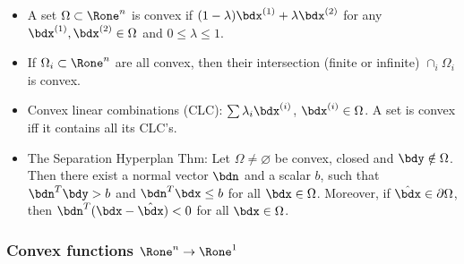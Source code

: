 \documentclass[a4paper]{article}
\begin{document}
\begin{itemize}
  \item A set $\Omega\subset\Rone^n$ is convex if
    $(1-\lambda)\bdx^{(1)}+\lambda\bdx^{(2)}$
    for any
    $\bdx^{(1)},\bdx^{(2)}\in\Omega$ and
    $0\le\lambda\le1$.

  \item If $\Omega_i\subset\Rone^n$ are all convex, then their
    intersection (finite or infinite) $\cap_i \Omega_i$ is convex.

  \item Convex linear combinations (CLC):
    $\sum\lambda_i\bdx^{(i)}$, $\bdx^{(i)}\in\Omega$.
    A set is convex iff it contains all
    its CLC's.

  \item The Separation Hyperplan Thm: Let $\Omega\neq\varnothing$ be convex,
    closed and $\bdy\notin\Omega$.
    Then there exist
    a normal vector $\bdn$ and a scalar $b$, such that $\bdn^T\bdy>b$
    and $\bdn^T\bdx\le b$ for all $\bdx\in\Omega$.
    Moreover, if $\hat\bdx\in\partial\Omega$, then $\bdn^T(\bdx-\hat\bdx)<0$
    for all $\bdx\in\Omega$.
\end{itemize}

\subsubsection*{Convex functions $\Rone^n\to\Rone^1$}%
\end{document}

